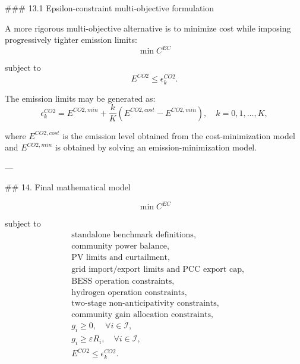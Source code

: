 ### 13.1 Epsilon-constraint multi-objective formulation

A more rigorous multi-objective alternative is to minimize cost while imposing progressively tighter emission limits:
$$ \min C^{EC} $$

subject to
$$ E^{CO2}\le \epsilon^{CO2}_{k}. $$

The emission limits may be generated as:
$$ \epsilon^{CO2}_{k}=E^{CO2,min}+\frac{k}{K}\left(E^{CO2,cost}-E^{CO2,min}\right),
\quad k=0,1,\ldots,K, $$

where $E^{CO2,cost}$ is the emission level obtained from the cost-minimization model and $E^{CO2,min}$ is obtained by solving an emission-minimization model.

---

## 14. Final mathematical model

$$ \min C^{EC} $$

subject to
\begin{align}
&\text{standalone benchmark definitions,}\nonumber\\
&\text{community power balance,}\nonumber\\
&\text{PV limits and curtailment,}\nonumber\\
&\text{grid import/export limits and PCC export cap,}\nonumber\\
&\text{BESS operation constraints,}\nonumber\\
&\text{hydrogen operation constraints,}\nonumber\\
&\text{two-stage non-anticipativity constraints,}\nonumber\\
&\text{community gain allocation constraints,}\nonumber\\
&g_i\ge 0,\quad \forall i\in\mathcal{I},\\
&g_i\ge \varepsilon R_i,\quad \forall i\in\mathcal{I},\\
&E^{CO2}\le \epsilon^{CO2}_{k}. 
\end{align}